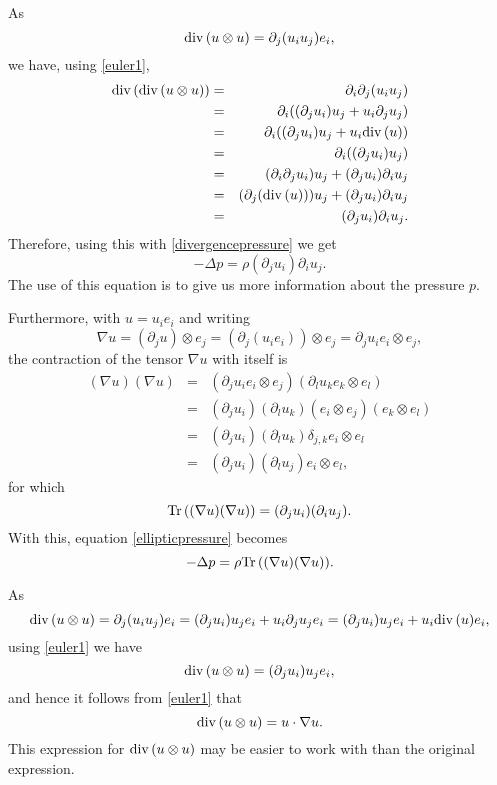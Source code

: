\documentclass{article}
\newcommand{\Tr}{\ensuremath\mathrm{Tr}\,}
\renewcommand{\div}{\ensuremath\mathrm{div}\,}
\theoremstyle{definition}
\begin{document}
As
\[
\div(u \otimes u) = \partial_j(u_i u_j)e_i,
\]
we have, using \eqref{euler1},
\begin{eqnarray*}
\div(\div(u \otimes u))& =& \partial_i \partial_j(u_iu_j) \\
&=& \partial_i((\partial_ju_i)u_j + u_i \partial_j u_j)\\
&=&\partial_i((\partial_j u_i)u_j + u_i \div(u))\\
&=&\partial_i((\partial_j u_i)u_j)\\
&=&(\partial_i \partial_j u_i)u_j + (\partial_j u_i)\partial_i u_j\\
&=&(\partial_j (\div(u))) u_j + (\partial_j u_i)\partial_i u_j\\
&=&(\partial_j u_i)\partial_i u_j.
\end{eqnarray*}
Therefore, using this
with \eqref{divergencepressure} we get
\begin{equation}
-\Delta p = \rho (\partial_j u_i)\partial_i u_j.
\label{ellipticpressure}
\end{equation}
The use of this equation is to give us more information about the pressure $p$.

Furthermore,
with $u=u_i e_i$ and writing
\[
\nabla u = (\partial_j u) \otimes e_j = (\partial_j (u_i e_i)) \otimes e_j = \partial_j u_i e_i \otimes e_j,
\]
the contraction of the tensor $\nabla u$ with itself is
\begin{eqnarray*}
(\nabla u)(\nabla u) &=& (\partial_j u_i e_i \otimes e_j)(\partial_l u_k e_k \otimes e_l)\\
&=&(\partial_j u_i)(\partial_l u_k) (e_i \otimes e_j)(e_k \otimes e_l)\\
&=&(\partial_j u_i)(\partial_l u_k) \delta_{j,k} e_i \otimes e_l\\
&=&(\partial_j u_i)(\partial_l u_j) e_i \otimes e_l,
\end{eqnarray*}
for which
\[
\Tr((\nabla u)(\nabla u)) = (\partial_j u_i)(\partial_i u_j).
\]
With this, equation  \eqref{ellipticpressure} becomes
\[
-\Delta p = \rho \Tr((\nabla u)(\nabla u)).
\]


As
\[
\div(u \otimes u)=\partial_j(u_i u_j) e_i = (\partial_j u_i)u_je_i + u_i \partial_j u_j e_i = (\partial_j u_i)u_je_i + u_i \div(u) e_i,
\]
using \eqref{euler1} we have
\[
\div(u \otimes u) 
=(\partial_j u_i)u_je_i,
\]
and hence it follows from \eqref{euler1} that
\begin{equation}
\div(u \otimes u) = u \cdot \nabla u.
\label{materialform}
\end{equation}
This expression for $\div(u \otimes u)$ may be easier to work with than the original expression.
\end{document}
